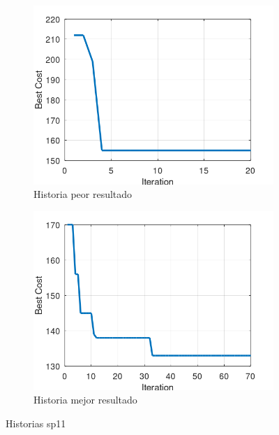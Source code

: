 \documentclass[12pt, a4paper]{article}
\begin{document}
\begin{figure}[H]
    \centering
    \begin{subfigure}[b]{0.45\textwidth}
        \centering
        \includegraphics[width=\textwidth]{img/sp11-worst-history.png}
        \caption{Historia peor resultado}
        \label{fig:sp11-worst-history}
    \end{subfigure}
    \hfill
    \begin{subfigure}[b]{0.45\textwidth}
        \centering
        \includegraphics[width=\textwidth]{img/sp11-best-history.png}
        \caption{Historia mejor resultado}
        \label{fig:sp11-best-history}
    \end{subfigure}
    \caption{Historias sp11}
    \label{fig:sp11-histories}
\end{figure}
\end{document}
